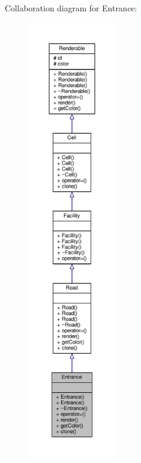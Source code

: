Collaboration diagram for Entrance\+:
\nopagebreak
\begin{figure}[H]
\begin{center}
\leavevmode
\includegraphics[height=550pt]{classEntrance__coll__graph}
\end{center}
\end{figure}
